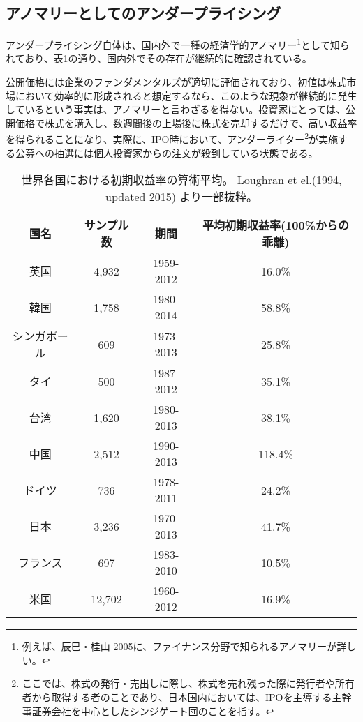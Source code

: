 \documentclass{jsarticle}
\begin{document}
\subsection{アノマリーとしてのアンダープライシング}
アンダープライシング自体は、国内外で一種の経済学的アノマリー\footnote[3]{例えば、辰巳・桂山 2005\cite{tatsumi}に、ファイナンス分野で知られるアノマリーが詳しい。}として知られており、表\ref{around_world}の通り、国内外でその存在が継続的に確認されている。 \par
公開価格には企業のファンダメンタルズが適切に評価されており、初値は株式市場において効率的に形成されると想定するなら、このような現象が継続的に発生しているという事実は、アノマリーと言わざるを得ない。投資家にとっては、公開価格で株式を購入し、数週間後の上場後に株式を売却するだけで、高い収益率を得られることになり、実際に、IPO時において、アンダーライター\footnote[4]{ここでは、株式の発行・売出しに際し、株式を売れ残った際に発行者や所有者から取得する者のことであり、日本国内においては、IPOを主導する主幹事証券会社を中心としたシンジゲート団のことを指す。}が実施する公募への抽選には個人投資家からの注文が殺到している状態である。

\begin{table}[h]
	\caption{世界各国における初期収益率の算術平均。
	Loughran et el.(1994, updated 2015) \cite{Loughran}より一部抜粋。}
	\label{around_world}
	\centering
	\begin{tabular}{cccc}
		\hline
		国名&サンプル数&期間&平均初期収益率(100\%からの乖離) \\
		\hline \hline
		英国&4,932&1959-2012&16.0\% \\
		韓国&1,758&1980-2014& 58.8\% \\
		シンガポール&609&1973-2013&25.8\% \\
		タイ&500&1987-2012&35.1\%\\
		台湾 &1,620 &1980-2013&38.1\% \\
		中国&2,512&1990-2013&118.4\%\\
		ドイツ&736&1978-2011&24.2\% \\
		日本&3,236&1970-2013&41.7\% \\
		フランス & 697 & 1983-2010 & 10.5\% \\
		米国&12,702&1960-2012&16.9\%\\
		\hline
	\end{tabular}
\end{table}
\end{document}
